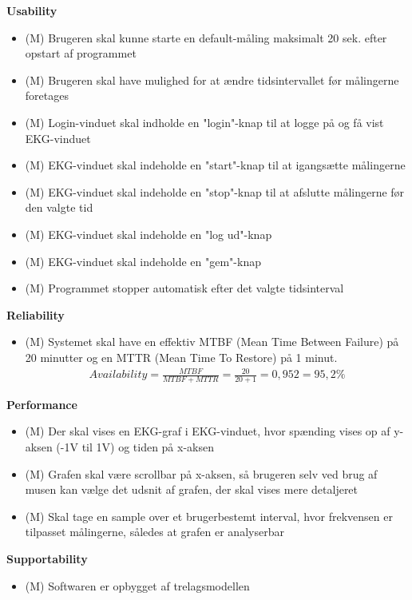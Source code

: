 \textbf{Usability}
\begin{itemize}
	\item (M) Brugeren skal kunne starte en default-måling maksimalt 20 sek. efter opstart af programmet
	\item (M) Brugeren skal have mulighed for at ændre tidsintervallet før målingerne foretages
	\item (M) Login-vinduet skal indholde en "login"-knap til at logge på og få vist EKG-vinduet
	\item (M) EKG-vinduet skal indeholde en "start"-knap til at igangsætte målingerne
	\item (M) EKG-vinduet  skal indeholde en "stop"-knap til at afslutte målingerne før den valgte tid
	\item (M) EKG-vinduet skal indeholde en "log ud"-knap
	\item (M) EKG-vinduet  skal indeholde en "gem"-knap
	\item (M) Programmet stopper automatisk efter det valgte tidsinterval
\end{itemize}

\textbf{Reliability}
\begin{itemize}
	\item (M) Systemet skal have en effektiv MTBF (Mean Time Between Failure) på 20 minutter og en MTTR (Mean Time To Restore) på 1 minut.
				\begin{align}
					Availability = \frac{MTBF}{MTBF+MTTR} = \frac{20}{20+1} = 0,952 = 95,2 \%
				\end{align}

\end{itemize}

\textbf{Performance}
\begin{itemize}
	\item (M) Der skal vises en EKG-graf i EKG-vinduet, hvor spænding vises op af y-aksen (-1V til 1V) og tiden på x-aksen
	\item (M) Grafen skal være scrollbar på x-aksen, så brugeren selv ved brug af musen kan vælge det udsnit af grafen, der skal vises mere detaljeret
	\item (M) Skal tage en sample over et brugerbestemt interval, hvor frekvensen  er tilpasset målingerne, således at grafen er analyserbar
\end{itemize}

\textbf{Supportability}
\begin{itemize}
	\item (M) Softwaren er opbygget af trelagsmodellen
\end{itemize}
















